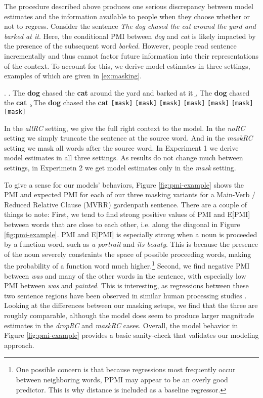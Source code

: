\documentclass[12pt]{article}
\begin{document}
The procedure described above produces one serious discrepancy between model estimates and the information available to people when they choose whether or not to regress. Consider the sentence \textit{The dog chased the cat around the yard and barked at it}. Here, the conditional PMI between \textit{dog} and \textit{cat} is likely impacted by the presence of the subsequent word \textit{barked}. However, people read sentence incrementally and thus cannot factor future information into their representations of the context. To account for this, we derive model estimates in three settings, examples of which are given in \ref{ex:masking}.

\ex. \label{ex:masking}
\a. The \textbf{dog} chased the \textbf{cat} around the yard and barked at it {\sc [allRC]}
\b. The \textbf{dog} chased the \textbf{cat} {\sc [noRC]}
\c. The \textbf{dog} chased the \textbf{cat} \texttt{[mask]} \texttt{[mask]} \texttt{[mask]} \texttt{[mask]} \texttt{[mask]} \texttt{[mask]} \texttt{[mask]} {\sc [maskRC]}

In the \textit{allRC} setting, we give the full right context to the model. In the \textit{noRC} setting we simply truncate the sentence at the source word. And in the \textit{maskRC} setting we mask all words after the source word. In Experiment 1 we derive model estimates in all three settings. As results do not change much between settings, in Experimetn 2 we get model estimates only in the \textit{mask} setting.

To give a sense for our models' behaviors, Figure \ref{fig:pmi-example} shows the PMI and expected PMI for each of our three masking variants for a Main-Verb / Reduced Relative Clause (MVRR) gardenpath sentence. There are a couple of things to note: First, we tend to find strong positive values of PMI and E[PMI] between words that are close to each other, i.e. along the diagonal in Figure \ref{fig:pmi-example}. PMI and E[PMI] is especially strong when a noun is proceeded by a function word, such as \textit{a portrait} and \textit{its beauty}. This is because the presence of the noun severely constraints the space of possible proceeding words, making the probability of a function word much higher.\footnote{One possible concern is that because regressions most frequently occur between neighboring words, PPMI may appear to be an overly good predictor. This is why distance is included as a baseline regressor.} Second, we find negative PMI between \textit{was} and many of the other words in the sentence, with especially low PMI between \textit{was} and \textit{painted}. This is interesting, as regressions between these two sentence regions have been observed in similar human processing studies \citep{frazier1982making}. Looking at the differences between our masking setups, we find that the three are roughly comparable, although the model does seem to produce larger magnitude estimates in the \textit{dropRC} and \textit{maskRC} cases. Overall, the model behavior in Figure \ref{fig:pmi-example} provides a basic sanity-check that validates our modeling approach.
\end{document}
